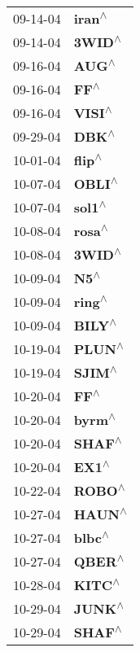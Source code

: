 \begin{supertabular}{p{0.08\textwidth}p{0.2\textwidth}}
 09-14-04 &    \textbf{iran\textsuperscript{$\wedge$}} \\
 09-14-04 &    \textbf{3WID\textsuperscript{$\wedge$}} \\
 09-16-04 &     \textbf{AUG\textsuperscript{$\wedge$}} \\
 09-16-04 &      \textbf{FF\textsuperscript{$\wedge$}} \\
 09-16-04 &    \textbf{VISI\textsuperscript{$\wedge$}} \\
 09-29-04 &     \textbf{DBK\textsuperscript{$\wedge$}} \\
 10-01-04 &    \textbf{flip\textsuperscript{$\wedge$}} \\
 10-07-04 &    \textbf{OBLI\textsuperscript{$\wedge$}} \\
 10-07-04 &    \textbf{sol1\textsuperscript{$\wedge$}} \\
 10-08-04 &    \textbf{rosa\textsuperscript{$\wedge$}} \\
 10-08-04 &    \textbf{3WID\textsuperscript{$\wedge$}} \\
 10-09-04 &      \textbf{N5\textsuperscript{$\wedge$}} \\
 10-09-04 &    \textbf{ring\textsuperscript{$\wedge$}} \\
 10-09-04 &    \textbf{BILY\textsuperscript{$\wedge$}} \\
 10-19-04 &    \textbf{PLUN\textsuperscript{$\wedge$}} \\
 10-19-04 &    \textbf{SJIM\textsuperscript{$\wedge$}} \\
 10-20-04 &      \textbf{FF\textsuperscript{$\wedge$}} \\
 10-20-04 &    \textbf{byrm\textsuperscript{$\wedge$}} \\
 10-20-04 &    \textbf{SHAF\textsuperscript{$\wedge$}} \\
 10-20-04 &     \textbf{EX1\textsuperscript{$\wedge$}} \\
 10-22-04 &    \textbf{ROBO\textsuperscript{$\wedge$}} \\
 10-27-04 &    \textbf{HAUN\textsuperscript{$\wedge$}} \\
 10-27-04 &    \textbf{blbc\textsuperscript{$\wedge$}} \\
 10-27-04 &    \textbf{QBER\textsuperscript{$\wedge$}} \\
 10-28-04 &    \textbf{KITC\textsuperscript{$\wedge$}} \\
 10-29-04 &    \textbf{JUNK\textsuperscript{$\wedge$}} \\
 10-29-04 &    \textbf{SHAF\textsuperscript{$\wedge$}} \\

\end{supertabular}
